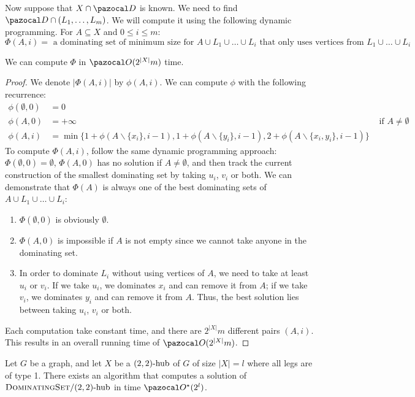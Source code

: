 Now suppose that $X \cap \D$ is known. We need to find $\D \cap (L_1, \dots, L_m)$. We will compute it using the following dynamic programming. For $A \subseteq X$ and $0 \leq i \leq m$:
$$\Phi(A, i) = \text{ a dominating set of minimum size for $A \cup L_1 \cup \dots \cup L_i$ that only uses vertices from $L_1 \cup \dots \cup L_i$}.$$

\begin{lemma}
    \label{lemma:domset-phi}
    We can compute $\Phi$ in $\O(2^{|X|}m)$ time.
\end{lemma}

\begin{proof}
    We denote $|\Phi(A, i)|$ by $\phi(A, i)$. We can compute $\phi$ with the following recurrence:
    \begin{align}
        \phi(\emptyset, 0) &= 0\\
        \phi(A, 0) &= +\infty & \text{ if } A \neq \emptyset\\
        \phi(A, i) &= \min\{1 + \phi(A \backslash \{x_i\}, i-1), 1 + \phi(A \backslash \{y_i\}, i-1), 2 + \phi(A \backslash \{x_i, y_i\}, i-1)\}
    \end{align}
    To compute $\Phi(A, i)$, follow the same dynamic programming approach: $\Phi(\emptyset, 0) = \emptyset$, $\Phi(A, 0)$ has no solution if $A \neq \emptyset$, and then track the current construction of the smallest dominating set by taking $u_i$, $v_i$ or both. We can demonstrate that $\Phi(A)$ is always one of the best dominating sets of $A \cup L_1 \cup \dots \cup L_i$:
    \begin{enumerate}
        \item $\Phi(\emptyset, 0)$ is obviously $\emptyset$.
        \item $\Phi(A, 0)$ is impossible if $A$ is not empty since we cannot take anyone in the dominating set.
        \item In order to dominate $L_i$ without using vertices of $A$, we need to take at least $u_i$ or $v_i$. If we take $u_i$, we dominates $x_i$ and can remove it from $A$; if we take $v_i$, we dominates $y_i$ and can remove it from $A$. Thus, the best solution lies between taking $u_i$, $v_i$ or both.
    \end{enumerate}
    Each computation take constant time, and there are $2^{|X|}m$ different pairs $(A, i)$. This results in an overall running time of $\O(2^{|X|}m)$.
\end{proof}

\begin{theorem}
    \label{theorem:domset-22-type1}
    Let $G$ be a graph, and let $X$ be a $\sdhub[2,2]$ of $G$ of size $|X| = l$ where all legs are of type 1. There exists an algorithm that computes a solution of $\prob{DominatingSet}/\sdhub[2,2]$ in time $\O^\star(2^l)$.
\end{theorem}

